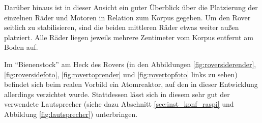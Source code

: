 Darüber hinaus ist in dieser Ansicht ein guter Überblick über die Platzierung der einzelnen Räder und Motoren in Relation zum Korpus gegeben.
Um den Rover seitlich zu stabilisieren, sind die beiden mittleren Räder etwas weiter außen platziert.
Alle Räder liegen jeweils mehrere Zentimeter vom Korpus entfernt am Boden auf.

Im \enquote{Bienenstock} am Heck des Rovers (in den Abbildungen \ref{fig:roversiderender}, \ref{fig:roversidefoto}, \ref{fig:rovertoprender} und \ref{fig:rovertopfoto} links zu sehen) befindet sich beim realen Vorbild ein Atomreaktor, auf den in dieser Entwicklung allerdings verzichtet wurde.
Stattdessen lässt sich in diesem sehr gut der verwendete Lautsprecher (siehe dazu Abschnitt \ref{sec:inst_konf_raspi} und Abbildung \ref{fig:lautsprecher}) unterbringen. %
